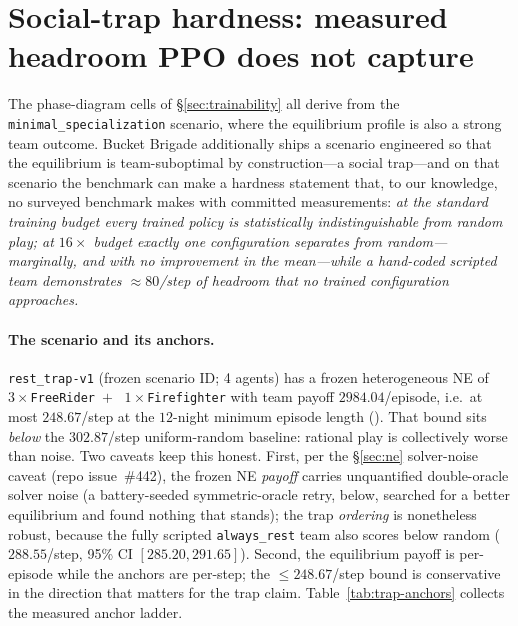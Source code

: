\documentclass{anvil-paper}
\begin{document}
\section{Social-trap hardness: measured headroom PPO does not capture}
\label{sec:resttrap}

The phase-diagram cells of \S\ref{sec:trainability} all derive from the
\texttt{minimal\_specialization} scenario, where the equilibrium profile
is also a strong team outcome. Bucket Brigade additionally ships a
scenario engineered so that the equilibrium is team-suboptimal by
construction---a social trap---and on that scenario the benchmark can
make a hardness statement that, to our knowledge, no surveyed benchmark
makes with committed measurements: \emph{at the standard training
budget every trained policy is statistically indistinguishable from
random play; at $16{\times}$ budget exactly one configuration separates
from random---marginally, and with no improvement in the mean---while a
hand-coded scripted team demonstrates ${\approx}80$/step of headroom
that no trained configuration approaches.}

\paragraph{The scenario and its anchors.}
\texttt{rest\_trap-v1} (frozen scenario ID; 4 agents) has a frozen
heterogeneous NE of $3{\times}$\texttt{FreeRider}~$+$~%
$1{\times}$\texttt{Firefighter} with team payoff $2984.04$/episode,
i.e.\ at most $248.67$/step at the $12$-night minimum episode length
().
That bound sits \emph{below} the $302.87$/step uniform-random baseline:
rational play is collectively worse than noise. Two caveats keep this
honest. First, per the \S\ref{sec:ne} solver-noise caveat (repo
issue~\#442), the frozen NE \emph{payoff} carries unquantified
double-oracle solver noise (a battery-seeded symmetric-oracle retry,
below, searched for a better equilibrium and found nothing that
stands); the trap \emph{ordering} is nonetheless robust, because the
fully scripted \texttt{always\_rest} team also scores below random
($288.55$/step, 95\% CI $[285.20, 291.65]$). Second, the equilibrium
payoff is per-episode while the anchors are per-step; the
$\leq 248.67$/step bound is conservative in the direction that matters
for the trap claim. Table~\ref{tab:trap-anchors} collects the measured
anchor ladder.
\end{document}
